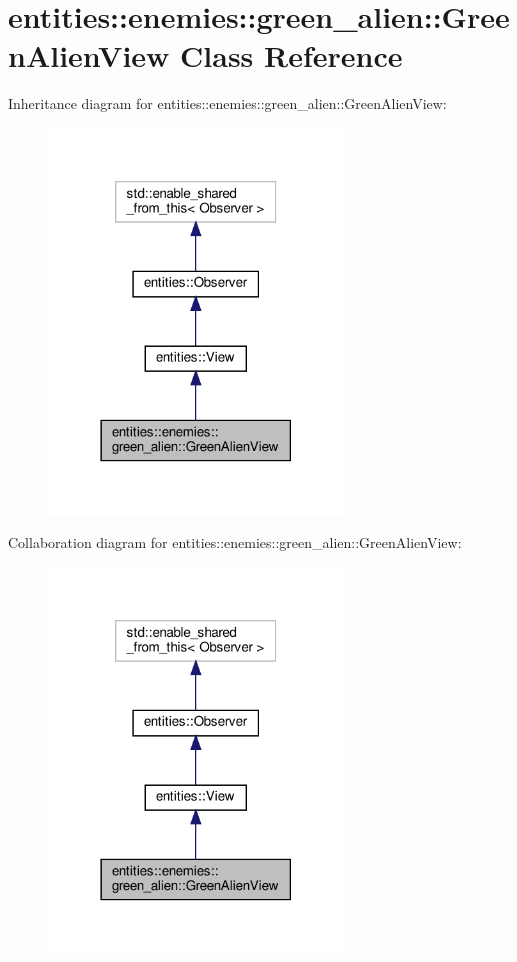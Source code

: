 \hypertarget{classentities_1_1enemies_1_1green__alien_1_1GreenAlienView}{}\section{entities\+:\+:enemies\+:\+:green\+\_\+alien\+:\+:Green\+Alien\+View Class Reference}
\label{classentities_1_1enemies_1_1green__alien_1_1GreenAlienView}


Inheritance diagram for entities\+:\+:enemies\+:\+:green\+\_\+alien\+:\+:Green\+Alien\+View\+:\nopagebreak
\begin{figure}[H]
\begin{center}
\leavevmode
\includegraphics[width=222pt]{classentities_1_1enemies_1_1green__alien_1_1GreenAlienView__inherit__graph}
\end{center}
\end{figure}


Collaboration diagram for entities\+:\+:enemies\+:\+:green\+\_\+alien\+:\+:Green\+Alien\+View\+:\nopagebreak
\begin{figure}[H]
\begin{center}
\leavevmode
\includegraphics[width=222pt]{classentities_1_1enemies_1_1green__alien_1_1GreenAlienView__coll__graph}
\end{center}
\end{figure}
